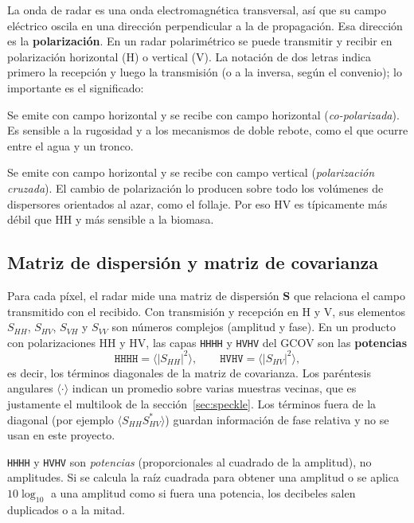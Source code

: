\documentclass[11pt,a4paper]{article}
\begin{document}
La onda de radar es una onda electromagnética transversal, así que su campo eléctrico oscila en una dirección
perpendicular a la de propagación. Esa dirección es la \textbf{polarización}. En un radar polarimétrico se
puede transmitir y recibir en polarización horizontal (H) o vertical (V). La notación de dos letras indica
primero la recepción y luego la transmisión (o a la inversa, según el convenio); lo importante es el
significado:
\begin{description}[style=nextline]
  \item[HH] Se emite con campo horizontal y se recibe con campo horizontal (\emph{co-polarizada}). Es sensible
        a la rugosidad y a los mecanismos de doble rebote, como el que ocurre entre el agua y un tronco.
  \item[HV] Se emite con campo horizontal y se recibe con campo vertical (\emph{polarización cruzada}). El
        cambio de polarización lo producen sobre todo los volúmenes de dispersores orientados al azar, como el
        follaje. Por eso HV es típicamente más débil que HH y más sensible a la biomasa.
\end{description}

\subsection{Matriz de dispersión y matriz de covarianza}

Para cada píxel, el radar mide una matriz de dispersión $\mathbf S$ que relaciona el campo transmitido con el
recibido. Con transmisión y recepción en H y V, sus elementos $S_{HH}$, $S_{HV}$, $S_{VH}$ y $S_{VV}$ son
números complejos (amplitud y fase). En un producto con polarizaciones HH y HV, las capas \texttt{HHHH} y
\texttt{HVHV} del GCOV son las \textbf{potencias}
\begin{equation}
  \texttt{HHHH} = \langle |S_{HH}|^2 \rangle,
  \qquad
  \texttt{HVHV} = \langle |S_{HV}|^2 \rangle,
  \label{eq:cov-diag}
\end{equation}
es decir, los términos diagonales de la matriz de covarianza. Los paréntesis angulares $\langle\cdot\rangle$
indican un promedio sobre varias muestras vecinas, que es justamente el multilook de la
sección~\ref{sec:speckle}. Los términos fuera de la diagonal (por ejemplo $\langle S_{HH}S_{HV}^*\rangle$)
guardan información de fase relativa y no se usan en este proyecto.

\begin{cuidado}
\texttt{HHHH} y \texttt{HVHV} son \emph{potencias} (proporcionales al cuadrado de la amplitud), no amplitudes.
Si se calcula la raíz cuadrada para obtener una amplitud o se aplica $10\log_{10}$ a una amplitud como si fuera
una potencia, los decibeles salen duplicados o a la mitad.
\end{cuidado}
\end{document}
